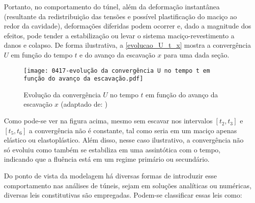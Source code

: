 Portanto, no comportamento do túnel, além da deformação instantânea (resultante da redistribuição das tensões e possível plastificação do maciço ao redor da cavidade), deformações diferidas podem ocorrer e, dado a magnitude dos efeitos, pode tender a estabilização ou levar o sistema maciço-revestimento a danos e colapso. De forma ilustrativa, a \autoref{evolucao_U_t_x} mostra a convergência $U$ em função do tempo $t$ e do avanço da escavação $x$ para uma dada seção.

\begin{figure}[H]
	\begin{center}
		\texttt{[image: 0417-evolução da convergência U no tempo t em função do avanço da escavação.pdf]}
	\end{center}
	\caption{\label{evolucao_U_t_x}Evolução da convergência $U$ no tempo $t$ em função do avanço da escavação $x$ (adaptado de: )}
\end{figure}

Como pode-se ver na figura acima, mesmo sem escavar nos intervalos $[t_2,t_3]$ e $[t_5,t_6]$ a convergência não é constante, tal como seria em um maciço apenas elástico ou elastoplástico. Além disso, nesse caso ilustrativo, a convergência não só evoluiu como também se estabiliza em uma assintótica com o tempo, indicando que a fluência está em um regime primário ou secundário. 

Do ponto de vista da modelagem há diversas formas de introduzir esse comportamento nas análises de túneis, sejam em soluções analíticas ou numéricas, diversas leis constitutivas são empregadas. Podem-se classificar essas leis como: 

